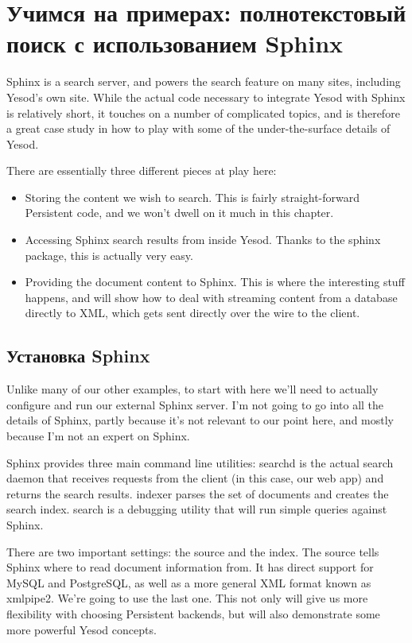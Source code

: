 \chapter{Учимся на примерах: полнотекстовый поиск с использованием Sphinx} %


Sphinx is a search server, and powers the search feature on many sites, including Yesod's own site. While the actual code necessary to integrate Yesod with Sphinx is relatively short, it touches on a number of complicated topics, and is therefore a great case study in how to play with some of the under-the-surface details of Yesod.

There are essentially three different pieces at play here:

\begin{itemize}
  \item Storing the content we wish to search. This is fairly straight-forward Persistent code, and we won't dwell on it much in this chapter.
  \item Accessing Sphinx search results from inside Yesod. Thanks to the sphinx package, this is actually very easy.
  \item Providing the document content to Sphinx. This is where the interesting stuff happens, and will show how to deal with streaming content from a database directly to XML, which gets sent directly over the wire to the client.
\end{itemize}

\section{Установка Sphinx} %

Unlike many of our other examples, to start with here we'll need to actually configure and run our external Sphinx server. I'm not going to go into all the details of Sphinx, partly because it's not relevant to our point here, and mostly because I'm not an expert on Sphinx.

Sphinx provides three main command line utilities: searchd is the actual search daemon that receives requests from the client (in this case, our web app) and returns the search results. indexer parses the set of documents and creates the search index. search is a debugging utility that will run simple queries against Sphinx.

There are two important settings: the source and the index. The source tells Sphinx where to read document information from. It has direct support for MySQL and PostgreSQL, as well as a more general XML format known as xmlpipe2. We're going to use the last one. This not only will give us more flexibility with choosing Persistent backends, but will also demonstrate some more powerful Yesod concepts.


